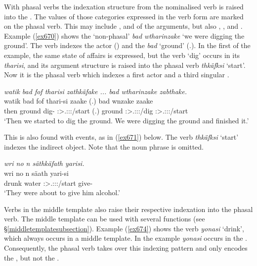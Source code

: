 With phasal verbs the indexation structure from the nominalised verb is raised into the . The values of those categories expressed in the verb form are marked on the phasal verb. This may include ,  and  of the arguments, but also , ,  and . Example (\ref{ex670}) shows the `non-phasal'  \emph{bad wtharinzake} `we were digging the ground'. The verb indexes the actor (\Fpl) and the  \emph{bad} `ground' (\Tsg.\F). In the first  of the example, the same state of affairs is expressed, but the verb `dig' occurs in its  \emph{tharisi}, and its argument structure is raised into the phasal verb \emph{thkäfksi} `start'. Now it is the phasal verb which indexes a first  actor and a third singular  .

\begin{exe}
	\ex \emph{watik bad fof tharisi zathkäfake ... bad wtharinzake zabthake.}\\
	\gll watik bad fof thari-si zaake (.) bad wnzake zaake\\
	then ground \Emph{} dig-\Nmlz{} \Fpl:\Sbj>\Tsg.\F:\Obj:\Pst:\Pfv/start (.) ground \Fpl:\Sbj>\Tsg.\F:\Obj:\Pst:\Ipfv/dig \Fpl:\Sbj>\Tsg.\F:\Obj:\Pst:\Pfv/start\\
	\trans `Then we started to dig the ground. We were digging the ground and finished it.'
	\label{ex670}
\end{exe}

This is also found with  events, as in (\ref{ex671}) below. The verb \emph{thkäfksi} `start' indexes the indirect object. Note that the  noun phrase is omitted.

\begin{exe}
	\ex \emph{wri no n säthkäfath yarisi.}\\
	\gll wri no n säath yari-si\\
	drunk water \Imn{} \Stpl:\Sbj>\Tsg.\Masc:\Io:\Pst:\Pfv/start give-\Nmlz{}\\
	\trans `They were about to give him alcohol.'
	\label{ex671}
\end{exe}

Verbs in the middle template also raise their respective indexation into the phasal verb. The middle template can be used with several functions (see \S{}\ref{middletemplatesubsection}). Example (\ref{ex674}) shows the verb \emph{yonasi} `drink', which always occurs in a middle template. In the example \emph{yonasi} occurs in the . Consequently, the phasal verb takes over this indexing pattern and only encodes the , but not the .

